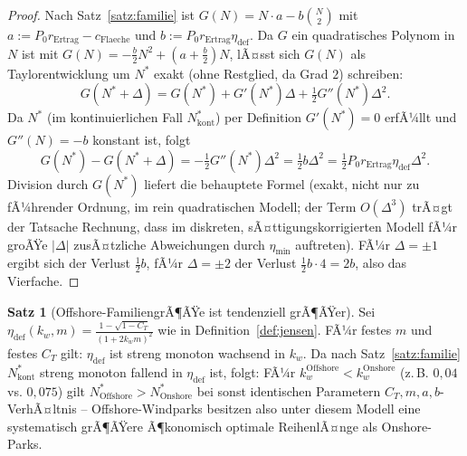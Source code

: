 ﻿\documentclass[a4paper,12pt]{article}
\theoremstyle{definition}
\newtheorem{satz}{Satz}
\begin{document}
\begin{proof}
Nach Satz~\ref{satz:familie} ist $G(N) = N\cdot a - b\binom{N}{2}$ mit $a:=P_0 r_{\mathrm{Ertrag}}-c_{\mathrm{Flaeche}}$ und $b:=P_0 r_{\mathrm{Ertrag}}\eta_{\mathrm{def}}$. Da $G$ ein quadratisches Polynom in $N$ ist mit $G(N)=-\tfrac{b}{2}N^2+(a+\tfrac{b}{2})N$, lÃ¤sst sich $G(N)$ als Taylorentwicklung um $N^*$ exakt (ohne Restglied, da Grad $2$) schreiben:
\[
G(N^*+\Delta) = G(N^*) + G'(N^*)\Delta + \tfrac{1}{2}G''(N^*)\Delta^2.
\]
Da $N^*$ (im kontinuierlichen Fall $N_{\mathrm{kont}}^*$) per Definition $G'(N^*)=0$ erfÃ¼llt und $G''(N)=-b$ konstant ist, folgt
\[
G(N^*)-G(N^*+\Delta) = -\tfrac{1}{2}G''(N^*)\Delta^2 = \tfrac{1}{2}b\Delta^2 = \tfrac{1}{2}P_0 r_{\mathrm{Ertrag}}\eta_{\mathrm{def}}\Delta^2.
\]
Division durch $G(N^*)$ liefert die behauptete Formel (exakt, nicht nur zu fÃ¼hrender Ordnung, im rein quadratischen Modell; der Term $O(\Delta^3)$ trÃ¤gt der Tatsache Rechnung, dass im diskreten, sÃ¤ttigungskorrigierten Modell fÃ¼r groÃŸe $|\Delta|$ zusÃ¤tzliche Abweichungen durch $\eta_{\min}$ auftreten). FÃ¼r $\Delta=\pm1$ ergibt sich der Verlust $\tfrac{1}{2}b$, fÃ¼r $\Delta=\pm2$ der Verlust $\tfrac{1}{2}b\cdot4=2b$, also das Vierfache. \qedhere
\end{proof}

\begin{satz}[Offshore-FamiliengrÃ¶ÃŸe ist tendenziell grÃ¶ÃŸer]
\label{satz:offshore_familie}
Sei $\eta_{\mathrm{def}}(k_w,m) = \frac{1-\sqrt{1-C_T}}{(1+2k_wm)^2}$ wie in Definition~\ref{def:jensen}. FÃ¼r festes $m$ und festes $C_T$ gilt: $\eta_{\mathrm{def}}$ ist streng monoton wachsend in $k_w$. Da nach Satz~\ref{satz:familie} $N^*_{\mathrm{kont}}$ streng monoton fallend in $\eta_{\mathrm{def}}$ ist, folgt: FÃ¼r $k_w^{\mathrm{Offshore}}<k_w^{\mathrm{Onshore}}$ (z.\,B. $0{,}04$ vs. $0{,}075$) gilt $N^{*}_{\mathrm{Offshore}} > N^{*}_{\mathrm{Onshore}}$ bei sonst identischen Parametern $C_T, m, a, b$-VerhÃ¤ltnis -- Offshore-Windparks besitzen also unter diesem Modell eine systematisch grÃ¶ÃŸere Ã¶konomisch optimale ReihenlÃ¤nge als Onshore-Parks.
\end{satz}
\end{document}
